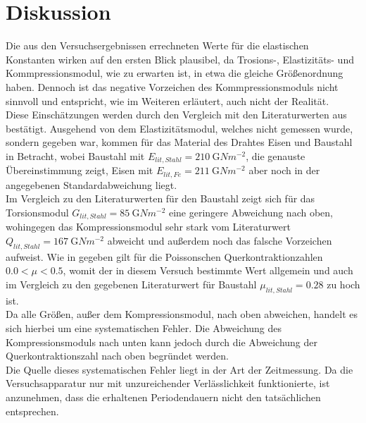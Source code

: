   
 
  
  \newpage
  \section{Diskussion}
    Die aus den Versuchsergebnissen errechneten Werte für die elastischen Konstanten wirken auf den ersten Blick plausibel,
    da Trosions-, Elastizitäts- und Kommpressionsmodul, wie zu erwarten ist, in etwa die gleiche Größenordnung haben. Dennoch 
    ist das negative Vorzeichen des Kommpressionsmoduls nicht sinnvoll und entspricht, wie im Weiteren erläutert, auch nicht der Realität.\\
    
    Diese Einschätzungen werden durch den Vergleich mit den Literaturwerten aus\,\cite{Kuchling07} bestätigt. Ausgehend von dem Elastizitätsmodul,
    welches nicht gemessen wurde, sondern gegeben war, kommen für das Material des Drahtes Eisen und Baustahl in Betracht,
    wobei Baustahl mit $E_{lit,Stahl} = \SI{210}{\giga Nm^{-2}}$, die genauste Übereinstimmung zeigt, 
    Eisen mit $E_{lit,Fe} = \SI{211}{\giga Nm^{-2}}$ aber noch in der angegebenen Standardabweichung liegt.\\
    Im Vergleich zu den Literaturwerten für den Baustahl zeigt sich für das Torsionsmodul $G_{lit,Stahl} =\SI{85}{\giga Nm^{-2}}$ eine 
    geringere Abweichung nach oben, wohingegen das Kompressionsmodul sehr stark vom Literaturwert $Q_{lit,Stahl} =\SI{167}{\giga Nm^{-2}}$ abweicht
    und außerdem noch das falsche Vorzeichen aufweist. Wie in \cite[S.189]{Kuchling07} gegeben gilt für die Poissonschen Querkontraktionzahlen
    $\num{0,0} < \mu < \num{0,5} $, womit der in diesem Versuch bestimmte Wert allgemein und auch im Vergleich zu den gegebenen Literaturwert
    für Baustahl $\mu_{lit,Stahl} =\num{0,28}$ zu hoch ist.\\
    
    Da alle Größen, außer dem Kompressionsmodul, nach oben abweichen, handelt es sich hierbei um eine systematischen Fehler.
    Die Abweichung des Kompressionsmoduls nach unten kann jedoch durch die Abweichung der Querkontraktionszahl nach oben begründet werden.\\
    Die Quelle dieses systematischen Fehler liegt in der Art der Zeitmessung. Da die Versuchsapparatur nur mit unzureichender Verlässlichkeit
    funktionierte, ist anzunehmen, dass die erhaltenen Periodendauern nicht den tatsächlichen entsprechen.\\
    
